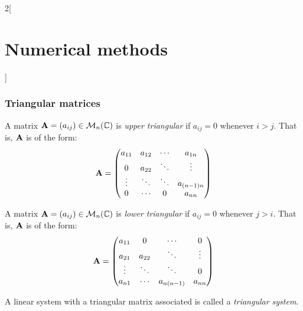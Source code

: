 \documentclass[../../../main.tex]{subfiles}
\begin{document}
\begin{multicols}{2}[\section{Numerical methods}]
\subsubsection*{Triangular matrices}
\begin{definition}
    A matrix $\vb{A}=(a_{ij})\in\mathcal{M}_n(\mathbb{C})$ is \textit{upper triangular} if $a_{ij}=0$ whenever $i>j$. That is, $\vb{A}$ is of the form: 
    $$\vb{A}=
    \begin{pmatrix}
        a_{11} & a_{12} & \cdots & a_{1n}\\
        0 & a_{22} & \ddots & \vdots \\
        \vdots & \ddots & \ddots & a_{(n-1)n}\\
        0 & \cdots & 0 & a_{nn}
    \end{pmatrix}
    $$
\end{definition}
\begin{definition}
    A matrix $\vb{A}=(a_{ij})\in\mathcal{M}_n(\mathbb{C})$ is \textit{lower triangular} if $a_{ij}=0$ whenever $j>i$. That is, $\vb{A}$ is of the form: 
    $$\vb{A}=
    \begin{pmatrix}
        a_{11} & 0 & \cdots & 0\\
        a_{21} & a_{22} & \ddots & \vdots \\
        \vdots & \ddots & \ddots & 0\\
        a_{n1} & \cdots & a_{n(n-1)} & a_{nn}
    \end{pmatrix}
    $$
\end{definition}
\begin{definition}
    A linear system with a triangular matrix associated is called a \textit{triangular system}.
\end{definition}

\end{multicols}
\end{document}
